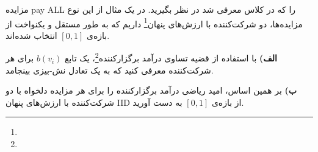 مزایده pay ALL را که در کلاس معرفی شد در نظر بگیرید. در یک مثال از این نوع مزایده‌ها، دو شرکت‌کننده با ارزش‌های پنهان\footnote{} داریم که به طور مستقل و یکنواخت از بازه‌ی $[0,1]$ انتخاب شده‌اند.

\vspace*{5pt}
\textbf{الف)}
با استفاده از قضیه تساوی درآمد برگزارکننده\footnote{}، یک تابع
$b(v_i)$
برای هر شرکت‌کننده معرفی کنید که به یک تعادل نش-بیزی بینجامد.

\vspace*{5pt}
\textbf{ب)}
بر همین اساس، امید ریاضی درآمد برگزار‌کننده را برای هر مزایده دلخواه با دو شرکت‌کننده با ارزش‌های پنهان IID از بازه‌ی $[0,1]$ به دست آورید.

